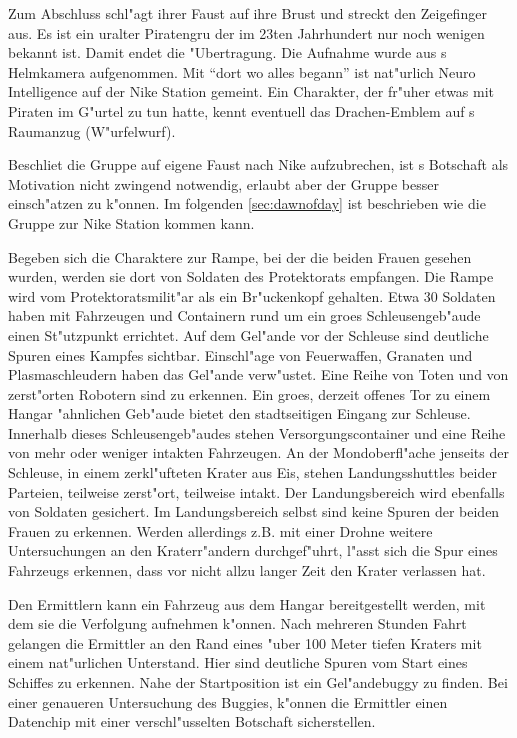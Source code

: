 Zum Abschluss schl"agt \xl{} ihrer Faust auf ihre Brust und streckt den Zeigefinger aus. Es ist ein uralter Piratengru\3 der im 23ten Jahrhundert nur noch wenigen bekannt ist. Damit endet die "Ubertragung. Die Aufnahme wurde aus \ml{}s Helmkamera aufgenommen. Mit "`dort wo alles begann"' ist nat"urlich Neuro Intelligence auf der Nike Station gemeint. Ein Charakter, der fr"uher etwas mit Piraten im G"urtel zu tun hatte, kennt eventuell das Drachen-Emblem auf \xl{}s Raumanzug (W"urfelwurf).

Beschlie\3t die Gruppe auf eigene Faust nach Nike aufzubrechen, ist \xl{}s Botschaft als Motivation nicht zwingend notwendig, erlaubt aber der Gruppe \xl{} besser einsch"atzen zu k"onnen. Im folgenden \cref{sec:dawnofday} ist beschrieben wie die Gruppe zur Nike Station kommen kann.

Begeben sich die Charaktere zur Rampe, bei der die beiden Frauen gesehen wurden, werden sie dort von Soldaten des Protektorats empfangen. Die Rampe wird vom Protektoratsmilit"ar als ein Br"uckenkopf gehalten. Etwa 30 Soldaten haben mit Fahrzeugen und Containern rund um ein gro\3es Schleusengeb"aude einen St"utzpunkt errichtet. Auf dem Gel"ande vor der Schleuse sind deutliche Spuren eines Kampfes sichtbar. Einschl"age von Feuerwaffen, Granaten und Plasmaschleudern haben das Gel"ande verw"ustet. Eine Reihe von Toten und von zerst"orten Robotern sind zu erkennen. Ein gro\3es, derzeit offenes Tor zu einem Hangar "ahnlichen Geb"aude bietet den stadtseitigen Eingang zur Schleuse. Innerhalb dieses Schleusengeb"audes stehen Versorgungscontainer und eine Reihe von mehr oder weniger intakten Fahrzeugen. An der Mondoberfl"ache jenseits der Schleuse, in einem zerkl"ufteten Krater aus Eis, stehen Landungsshuttles beider Parteien, teilweise zerst"ort, teilweise intakt. Der Landungsbereich wird ebenfalls von Soldaten gesichert. Im Landungsbereich selbst sind keine Spuren der beiden Frauen zu erkennen. Werden allerdings z.B. mit einer Drohne weitere Untersuchungen an den Kraterr"andern durchgef"uhrt, l"asst sich die Spur eines Fahrzeugs erkennen, dass vor nicht allzu langer Zeit den Krater verlassen hat. 

Den Ermittlern kann ein Fahrzeug aus dem Hangar bereitgestellt werden, mit dem sie die Verfolgung aufnehmen k"onnen. Nach mehreren Stunden Fahrt gelangen die Ermittler an den Rand eines "uber 100 Meter tiefen Kraters mit einem nat"urlichen Unterstand. Hier sind deutliche Spuren vom Start eines Schiffes zu erkennen. Nahe der Startposition ist ein Gel"andebuggy zu finden. Bei einer genaueren Untersuchung des Buggies, k"onnen die Ermittler einen Datenchip mit einer verschl"usselten Botschaft sicherstellen.

